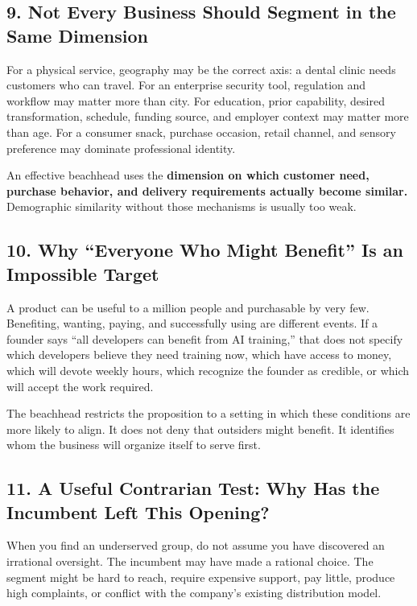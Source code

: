 \subsection*{9. Not Every Business Should Segment in the Same Dimension}

For a physical service, geography may be the correct axis: a dental clinic needs customers who can travel. For an enterprise security tool, regulation and workflow may matter more than city. For education, prior capability, desired transformation, schedule, funding source, and employer context may matter more than age. For a consumer snack, purchase occasion, retail channel, and sensory preference may dominate professional identity.

An effective beachhead uses the \textbf{dimension on which customer need, purchase behavior, and delivery requirements actually become similar.} Demographic similarity without those mechanisms is usually too weak.

\subsection*{10. Why ``Everyone Who Might Benefit'' Is an Impossible Target}

A product can be useful to a million people and purchasable by very few. Benefiting, wanting, paying, and successfully using are different events. If a founder says ``all developers can benefit from AI training,'' that does not specify which developers believe they need training now, which have access to money, which will devote weekly hours, which recognize the founder as credible, or which will accept the work required.

The beachhead restricts the proposition to a setting in which these conditions are more likely to align. It does not deny that outsiders might benefit. It identifies whom the business will organize itself to serve first.

\subsection*{11. A Useful Contrarian Test: Why Has the Incumbent Left This Opening?}

When you find an underserved group, do not assume you have discovered an irrational oversight. The incumbent may have made a rational choice. The segment might be hard to reach, require expensive support, pay little, produce high complaints, or conflict with the company's existing distribution model.

